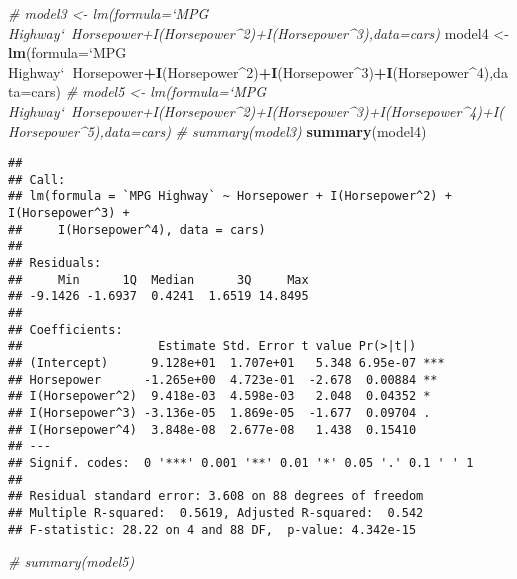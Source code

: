 \documentclass[]{article}
\newenvironment{Shaded}{\begin{snugshade}}{\end{snugshade}}
\newcommand{\CommentTok}[1]{\textcolor[rgb]{0.56,0.35,0.01}{\textit{#1}}}
\newcommand{\DataTypeTok}[1]{\textcolor[rgb]{0.13,0.29,0.53}{#1}}
\newcommand{\DecValTok}[1]{\textcolor[rgb]{0.00,0.00,0.81}{#1}}
\newcommand{\KeywordTok}[1]{\textcolor[rgb]{0.13,0.29,0.53}{\textbf{#1}}}
\newcommand{\NormalTok}[1]{#1}
\newcommand{\OperatorTok}[1]{\textcolor[rgb]{0.81,0.36,0.00}{\textbf{#1}}}
\newcommand{\StringTok}[1]{\textcolor[rgb]{0.31,0.60,0.02}{#1}}
\begin{document}
\begin{Shaded}
\begin{Highlighting}[]
\CommentTok{# model3 <- lm(formula=`MPG Highway`~Horsepower+I(Horsepower^2)+I(Horsepower^3),data=cars)}
\NormalTok{model4 <-}\StringTok{ }\KeywordTok{lm}\NormalTok{(}\DataTypeTok{formula=}\StringTok{`}\DataTypeTok{MPG Highway}\StringTok{`}\OperatorTok{~}\NormalTok{Horsepower}\OperatorTok{+}\KeywordTok{I}\NormalTok{(Horsepower}\OperatorTok{^}\DecValTok{2}\NormalTok{)}\OperatorTok{+}\KeywordTok{I}\NormalTok{(Horsepower}\OperatorTok{^}\DecValTok{3}\NormalTok{)}\OperatorTok{+}\KeywordTok{I}\NormalTok{(Horsepower}\OperatorTok{^}\DecValTok{4}\NormalTok{),}\DataTypeTok{data=}\NormalTok{cars)}
\CommentTok{# model5 <- lm(formula=`MPG Highway`~Horsepower+I(Horsepower^2)+I(Horsepower^3)+I(Horsepower^4)+I(Horsepower^5),data=cars)}
\CommentTok{# summary(model3)}
\KeywordTok{summary}\NormalTok{(model4)}
\end{Highlighting}
\end{Shaded}

\begin{verbatim}
## 
## Call:
## lm(formula = `MPG Highway` ~ Horsepower + I(Horsepower^2) + I(Horsepower^3) + 
##     I(Horsepower^4), data = cars)
## 
## Residuals:
##     Min      1Q  Median      3Q     Max 
## -9.1426 -1.6937  0.4241  1.6519 14.8495 
## 
## Coefficients:
##                   Estimate Std. Error t value Pr(>|t|)    
## (Intercept)      9.128e+01  1.707e+01   5.348 6.95e-07 ***
## Horsepower      -1.265e+00  4.723e-01  -2.678  0.00884 ** 
## I(Horsepower^2)  9.418e-03  4.598e-03   2.048  0.04352 *  
## I(Horsepower^3) -3.136e-05  1.869e-05  -1.677  0.09704 .  
## I(Horsepower^4)  3.848e-08  2.677e-08   1.438  0.15410    
## ---
## Signif. codes:  0 '***' 0.001 '**' 0.01 '*' 0.05 '.' 0.1 ' ' 1
## 
## Residual standard error: 3.608 on 88 degrees of freedom
## Multiple R-squared:  0.5619, Adjusted R-squared:  0.542 
## F-statistic: 28.22 on 4 and 88 DF,  p-value: 4.342e-15
\end{verbatim}

\begin{Shaded}
\begin{Highlighting}[]
\CommentTok{# summary(model5)}
\end{Highlighting}
\end{Shaded}

\begin{Shaded}
\end{Shaded}
\end{document}
